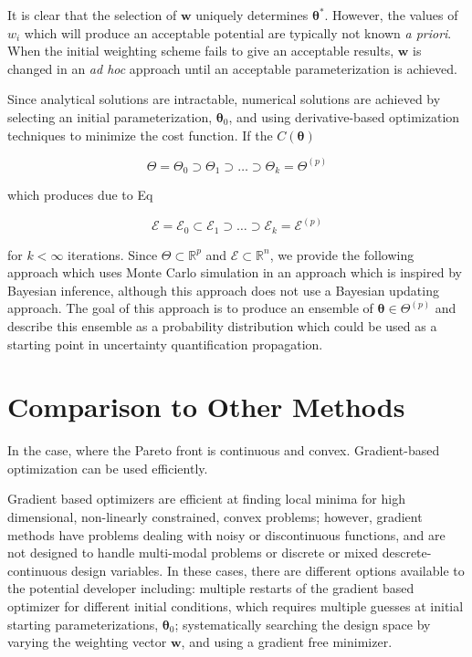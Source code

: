 It is clear that the selection of $\bm{w}$ uniquely determines $\bm{\theta}^*$.  However, the values of $w_i$ which will produce an acceptable potential are typically not known \emph{a priori}.  When the initial weighting scheme fails to give an acceptable results, $\bm{w}$ is changed in an \emph{ad hoc} approach until an acceptable parameterization is achieved.

Since analytical solutions are intractable, numerical solutions are achieved by selecting an initial parameterization, $\bm{\theta}_0$, and using derivative-based optimization techniques to minimize the cost function.  If the $C(\bm{\theta})$



\begin{equation}
    \Theta = \Theta_0 \supset \Theta_1 \supset \hdots \supset \Theta_k = \Theta^{(p)}
\end{equation}

which produces due to Eq %

\begin{equation}
    \mathcal{E} = \mathcal{E}_0 \subset \mathcal{E}_1 \supset \hdots \supset \mathcal{E}_k = \mathcal{E}^{(p)}
\end{equation}

for $k < \infty$ iterations.  Since $\Theta \subset \mathbb{R}^p$ and $\mathcal{E} \subset \mathbb{R}^n$, we provide the following approach which uses Monte Carlo simulation in an approach which is inspired by Bayesian inference, although this approach does not use a Bayesian updating approach.  The goal of this approach is to produce an ensemble of $\bm{\theta}\in \Theta^{(p)}$ and describe this ensemble as a probability distribution which could be used as a starting point in uncertainty quantification propagation.

\section{Comparison to Other Methods}

In the case, where the Pareto front is continuous and convex.  Gradient-based optimization can be used efficiently.

Gradient based optimizers are efficient at finding local minima for high dimensional, non-linearly constrained, convex problems; however, gradient methods have problems dealing with noisy or discontinuous functions, and are not designed to handle multi-modal problems or discrete or mixed descrete-continuous design variables.  In these cases, there are different options available to the potential developer including: multiple restarts of the gradient based optimizer for different initial conditions, which requires multiple guesses at initial starting parameterizations, $\bm{\theta}_0$; systematically searching the design space by varying the weighting vector $\bm{w}$, and using a gradient free minimizer.


